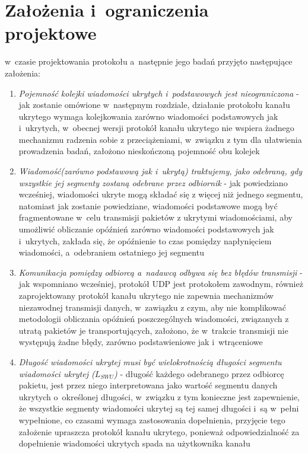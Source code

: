 \documentclass[a4paper, twoside, 12pt]{report}
\begin{document}
    \section{Założenia i~ograniczenia projektowe}
    w~czasie projektowania protokołu a~następnie jego badań przyjęto następujące założenia:
    \begin{enumerate}
        \item \emph{Pojemność kolejki wiadomości ukrytych i~podstawowych jest nieograniczona} -
            jak zostanie omówione w~następnym rozdziale, działanie protokołu
            kanału ukrytego wymaga kolejkowania zarówno wiadomości podstawowych
            jak i~ukrytych, w~obecnej wersji protokół kanału ukrytego nie wspiera
            żadnego mechanizmu radzenia sobie z przeciążeniami, w~związku z tym
            dla ułatwienia prowadzenia badań, założono nieskończoną pojemność obu kolejek

        \item \emph{Wiadomość(zarówno podstawową jak i~ukrytą) traktujemy, jako odebraną,
            gdy wszystkie jej segmenty zostaną odebrane przez odbiornik} - jak powiedziano
            wcześniej, wiadomości ukryte mogą składać się z więcej niż jednego segmentu,
            natomiast jak zostanie powiedziane, wiadomości podstawowe mogą być fragmentowane
            w~celu transmisji pakietów z ukrytymi wiadomościami, aby umożliwić
            obliczanie opóźnień zarówno wiadomości podstawowych jak i~ukrytych,
            zakłada się, że opóźnienie to czas pomiędzy napłynięciem wiadomości,
            a~odebraniem ostatniego jej segmentu

        \item \emph{Komunikacja pomiędzy odbiorcą a~nadawcą odbywa się bez błędów transmisji} -
            jak wspomniano wcześniej, protokół UDP jest protokołem zawodnym, również
            zaprojektowany protokół kanału ukrytego nie zapewnia mechanizmów niezawodnej
            transmisji danych, w~zawiązku z czym, aby nie komplikować metodologii
            obliczania opóźnień poszczególnych wiadomości, związanych z utratą
            pakietów je transportujących, założono, że w~trakcie transmisji nie
            występują żadne błędy, zarówno podstawieniowe jak i~wtrąceniowe

        \item \emph{Długość wiadomości ukrytej musi być wielokrotnością długości segmentu
            wiadomości ukrytej (\(L_{SWU}\))} - długość każdego odebranego przez odbiorcę pakietu,
            jest przez niego interpretowana jako wartość segmentu danych ukrytych o~określonej
            długości, w~związku z tym konieczne jest zapewnienie, że wszystkie segmenty
            wiadomości ukrytej są tej samej długości i~są w~pełni wypełnione, co czasami
            wymaga zastosowania dopełnienia, przyjęcie tego założenie upraszcza protokół
            kanału ukrytego, ponieważ odpowiedzialność za dopełnienie wiadomości ukrytych
            spada na użytkownika kanału
    \end{enumerate}
\end{document}
